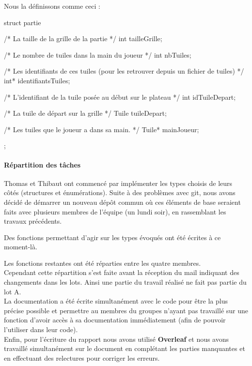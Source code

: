 \documentclass[12pt,a4paper]{article}
\begin{document}
Nous la définissons comme ceci :

\begin{verbatimtab}[4]
struct partie {
	/* La taille de la grille de la partie */
	int tailleGrille; 
    
    /* Le nombre de tuiles dans la main du joueur */
	int nbTuiles;
    
    /* Les identifiants de ces tuiles (pour les retrouver depuis un fichier de tuiles) */
	int* identifiantsTuiles; 
    
    /* L'identifiant de la tuile posée au début sur le plateau */
	int idTuileDepart;
    
    /* La tuile de départ sur la grille */
	Tuile tuileDepart; 
    
    /* Les tuiles que le joueur a dans sa main. */
	Tuile* mainJoueur;   
};
\end{verbatimtab}

\paragraph{Répartition des tâches\\}

Thomas et Thibaut ont commencé par implémenter les types choisis de leurs côtés (structures et énumérations). Suite à des problèmes avec git, nous avons décidé de démarrer un nouveau dépôt commun où ces éléments de base seraient faits avec plusieurs membres de l'équipe (un lundi soir), en rassemblant les travaux précédents. 

Des fonctions permettant d'agir sur les types évoqués ont été écrites à ce moment-là. 

Les fonctions restantes ont été réparties entre les quatre membres. \\

Cependant cette répartition s'est faite avant la réception du mail indiquant des changements dans les lots. Ainsi une partie du travail réalisé ne fait pas partie du lot A. \\

La documentation a été écrite simultanément avec le code pour être la plus précise possible et permettre au membres du groupes n'ayant pas travaillé sur une fonction d'avoir accès à sa documentation immédiatement (afin de pouvoir l'utiliser dans leur code).\\

Enfin, pour l'écriture du rapport nous avons utilisé \textbf{Overleaf} et nous avons travaillé simultanément sur le document en complétant les parties manquantes et en effectuant des relectures pour corriger les erreurs.
\end{document}
